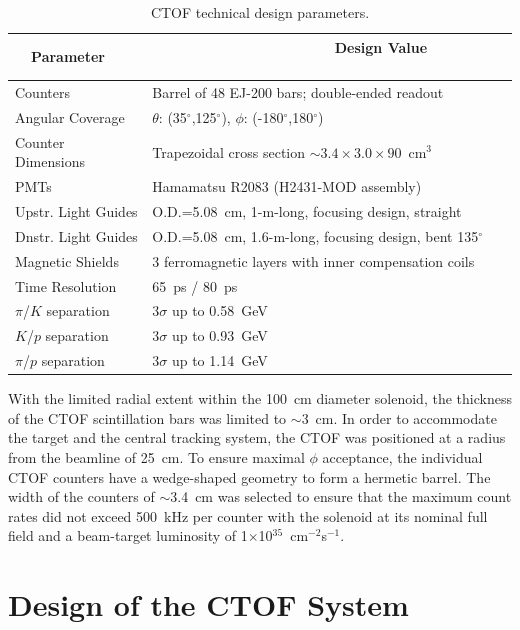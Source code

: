 \documentclass{elsart}
\begin{document}
\begin{table}[htbp]
\begin{center}
\begin{tabular} {ll} \hline
~~Parameter~~ &~~~~~~~~~~~~~~~~~~~~~~ Design Value ~~~~~~~~~~\\ \hline
Counters             & Barrel of 48 EJ-200 bars; double-ended readout \\
Angular Coverage     & $\theta$: (35$^\circ$,125$^\circ$), $\phi$: (-180$^\circ$,180$^\circ$) \\
Counter Dimensions   & Trapezoidal cross section $\sim 3.4 \times 3.0 \times 90$~cm$^3$ \\
PMTs                 & Hamamatsu R2083 (H2431-MOD assembly)    \\
Upstr. Light Guides  & O.D.=5.08~cm, 1-m-long, focusing design, straight \\
Dnstr. Light Guides  & O.D.=5.08~cm, 1.6-m-long, focusing design, bent 135$^\circ$ \\
Magnetic Shields     & 3 ferromagnetic layers with inner compensation coils \\
Time Resolution    & 65~ps / 80~ps\\
$\pi$/$K$ separation & 3$\sigma$ up to 0.58~GeV \\ 
$K$/$p$ separation   & 3$\sigma$ up to 0.93~GeV \\ 
$\pi$/$p$ separation & 3$\sigma$ up to 1.14~GeV \\ \hline
\end{tabular}
\end{center}
\caption{CTOF technical design parameters.}
\label{spec-table}
\end{table}

With the limited radial extent within the 100~cm diameter solenoid, the thickness of the CTOF
scintillation bars was limited to $\sim$3~cm. In order to accommodate the target and the central
tracking system, the CTOF was positioned at a radius from the beamline of 25~cm. To ensure maximal
$\phi$ acceptance, the individual CTOF counters have a wedge-shaped geometry to form a hermetic
barrel. The width of the counters of $\sim$3.4~cm was selected to ensure that the maximum count
rates did not exceed 500~kHz per counter with the solenoid at its nominal full field and a 
beam-target luminosity of 1$\times$10$^{35}$~cm$^{-2}$s$^{-1}$.

\section{Design of the CTOF System}
\label{sec:design}
\end{document}
